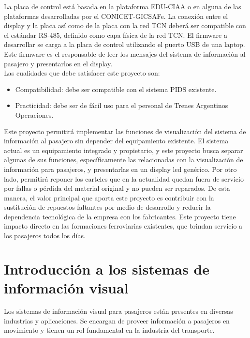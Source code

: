 La placa de control está basada en la plataforma EDU-CIAA \citep{proyecto-ciaa} o en alguna de las plataformas desarrolladas por el CONICET-GICSAFe. La conexión entre el display y la placa así como de la placa con la red TCN deberá ser compatible con el estándar RS-485, definido como capa física de la red TCN. El
firmware a desarrollar se carga a la placa de control utilizando el puerto USB de una laptop. Este firmware es el responsable de leer los mensajes del sistema de información al pasajero y presentarlos en el display.\\

Las cualidades que debe satisfacer este proyecto son:
\begin{itemize}
\item Compatibilidad: debe ser compatible con el sistema PIDS existente.
\item Practicidad: debe ser de fácil uso para el personal de Trenes Argentinos Operaciones.
\end{itemize}

Este proyecto permitirá implementar las funciones de visualización del sistema de información al pasajero sin depender del equipamiento existente. El sistema actual es un equipamiento integrado y propietario, y este proyecto busca separar algunas de sus funciones, específicamente las relacionadas con la visualización de información para pasajeros, y presentarlas en un display led genérico. Por otro lado, permitirá reponer los carteles que en la actualidad quedan fuera de servicio por fallas o pérdida del material original y no pueden ser reparados. De esta manera, el valor principal que aporta este proyecto es contribuir con la sustitución de repuestos faltantes por medio de desarrollo y reducir la dependencia tecnológica de la empresa con los fabricantes. Este proyecto tiene impacto directo en las formaciones ferroviarias existentes, que brindan servicio a los pasajeros todos los días.\\

\section{Introducción a los sistemas de información visual}

Los sistemas de información visual para pasajeros están presentes en diversas industrias y aplicaciones. Se encargan de proveer información a pasajeros en  movimiento y tienen un rol fundamental en la industria del transporte.\\

